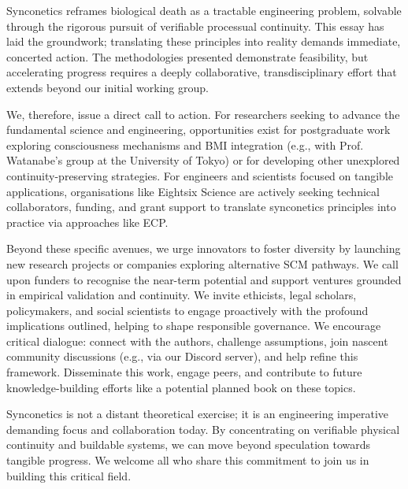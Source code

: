 \documentclass[10pt]{article}
\begin{document}
\begin{sloppypar}
  Synconetics reframes biological death as a tractable engineering problem, solvable through the rigorous pursuit of verifiable processual continuity. This essay has laid the groundwork; translating these principles into reality demands immediate, concerted action. The methodologies presented demonstrate feasibility, but accelerating progress requires a deeply collaborative, transdisciplinary effort that extends beyond our initial working group.

  We, therefore, issue a direct call to action. For researchers seeking to advance the fundamental science and engineering, opportunities exist for postgraduate work exploring consciousness mechanisms and BMI integration (e.g., with Prof. Watanabe’s group at the University of Tokyo) or for developing other unexplored continuity-preserving strategies. For engineers and scientists focused on tangible applications, organisations like Eightsix Science are actively seeking technical collaborators, funding, and grant support to translate synconetics principles into practice via approaches like ECP.

  Beyond these specific avenues, we urge innovators to foster diversity by launching new research projects or companies exploring alternative SCM pathways. We call upon funders to recognise the near-term potential and support ventures grounded in empirical validation and continuity. We invite ethicists, legal scholars, policymakers, and social scientists to engage proactively with the profound implications outlined, helping to shape responsible governance. We encourage critical dialogue: connect with the authors, challenge assumptions, join nascent community discussions (e.g., via our Discord server), and help refine this framework. Disseminate this work, engage peers, and contribute to future knowledge-building efforts like a potential planned book on these topics.

  Synconetics is not a distant theoretical exercise; it is an engineering imperative demanding focus and collaboration today. By concentrating on verifiable physical continuity and buildable systems, we can move beyond speculation towards tangible progress. We welcome all who share this commitment to join us in building this critical field.


  \pagebreak
  
  
  \nocite{*}

\end{sloppypar}
\end{document}
